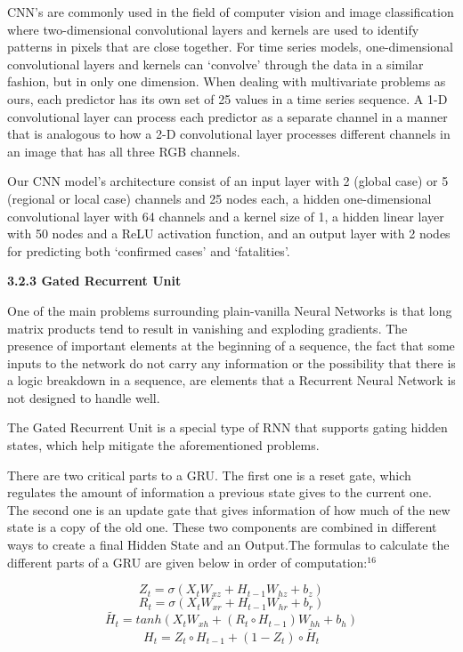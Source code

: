 \documentclass{article}
\begin{document}
CNN’s are commonly used in the field of computer vision and image classification where two-dimensional convolutional layers and kernels are used to identify patterns in pixels that are close together. For time series models, one-dimensional convolutional layers and kernels can ‘convolve’ through the data in a similar fashion, but in only one dimension. When dealing with multivariate problems as ours, each predictor has its own set of 25 values in a time series sequence. A 1-D convolutional layer can process each predictor as a separate channel in a manner that is analogous to how a 2-D convolutional layer processes different channels in an image that has all three RGB channels.

Our CNN model’s architecture consist of an input layer with 2 (global case) or 5 (regional or local case) channels and 25 nodes each, a hidden one-dimensional convolutional layer with 64 channels and a kernel size of 1, a hidden linear layer with 50 nodes and a ReLU activation function, and an output layer with 2 nodes for predicting both ‘confirmed cases’ and ‘fatalities’.

\textbf{3.2.3 Gated Recurrent Unit}

One of the main problems surrounding plain-vanilla Neural Networks is that long matrix products tend to result in vanishing and exploding gradients. The presence of important elements at the beginning of a sequence, the fact that some inputs to the network do not carry any information or the possibility that there is a logic breakdown in a sequence, are elements that a Recurrent Neural Network is not designed to handle well.

The Gated Recurrent Unit is a special type of RNN that supports gating hidden states, which help mitigate the aforementioned problems. 

There are two critical parts to a GRU. The first one is a reset gate, which regulates the amount of information a previous state gives to the current one. The second one is an update gate that gives information of how much of the new state is a copy of the old one. These two components are combined in different ways to create a final Hidden State and an Output.The formulas to calculate the different parts of a GRU are given below in order of computation:$^{16}$

$$Z_{t} = \sigma(X_{t}W_{xz} + H_{t-1}W_{hz} + b_{z})$$
$$R_{t} = \sigma(X_{t}W_{xr} + H_{t-1}W_{hr} + b_{r})$$
$$\tilde{H_{t}} = tanh(X_{t}W_{xh} + (R_{t} \circ H_{t-1})W_{hh}+b_{h})$$
$$H_{t} = Z_{t} \circ H_{t-1} + (1-Z_{t}) \circ \tilde{H_{t}}$$
\end{document}
